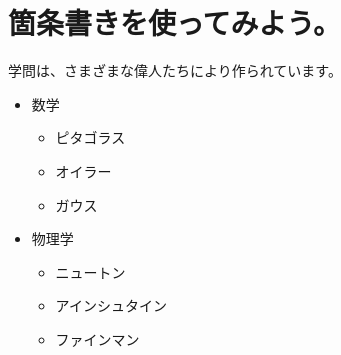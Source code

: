 \documentclass{ltjsarticle}
\begin{document}
\section{箇条書きを使ってみよう。}
学問は、さまざまな偉人たちにより作られています。
\begin{itemize}
\item
数学
  \begin{itemize}
    \item
    ピタゴラス
    \item
    オイラー
    \item
    ガウス
  \end{itemize}
\item
物理学
  \begin{itemize}
    \item
    ニュートン
    \item
    アインシュタイン
    \item
    ファインマン
  \end{itemize}
\end{itemize}
\end{document}
